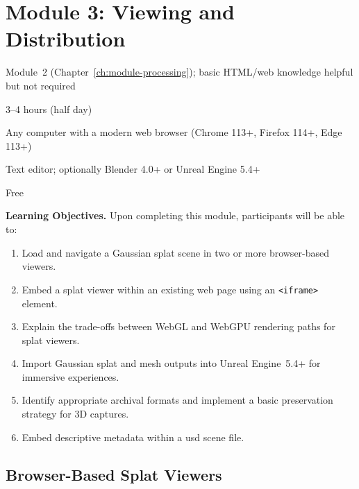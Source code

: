 \chapter{Module 3: Viewing and Distribution}
\label{ch:module-viewing}

\begin{tcolorbox}[
  enhanced,
  colback=LightGrey,
  colframe=MidGrey,
  fonttitle=\bfseries\sffamily,
  title={Module Information},
  sharp corners=south,
  boxrule=0.6pt
]
\begin{description}[font=\sffamily\bfseries, leftmargin=4cm, style=sameline]
  \item[Prerequisites] Module~2 (Chapter~\ref{ch:module-processing}); basic HTML/web knowledge helpful but not required
  \item[Duration] 3--4 hours (half day)
  \item[Hardware] Any computer with a modern web browser (Chrome 113+, Firefox 114+, Edge 113+)
  \item[Software] Text editor; optionally Blender 4.0+ or Unreal Engine 5.4+
  \item[Budget tier] Free
\end{description}
\end{tcolorbox}

\medskip

\noindent\textbf{Learning Objectives.} Upon completing this module, participants will be able to:
\begin{enumerate}
  \item Load and navigate a Gaussian splat scene in two or more browser-based viewers.
  \item Embed a splat viewer within an existing web page using an \texttt{<iframe>} element.
  \item Explain the trade-offs between WebGL and WebGPU rendering paths for splat viewers.
  \item Import Gaussian splat and mesh outputs into Unreal Engine~5.4+ for immersive experiences.
  \item Identify appropriate archival formats and implement a basic preservation strategy for 3D captures.
  \item Embed descriptive metadata within a \acrshort{usd} scene file.
\end{enumerate}

\section{Browser-Based Splat Viewers}
\label{sec:view-browser}

